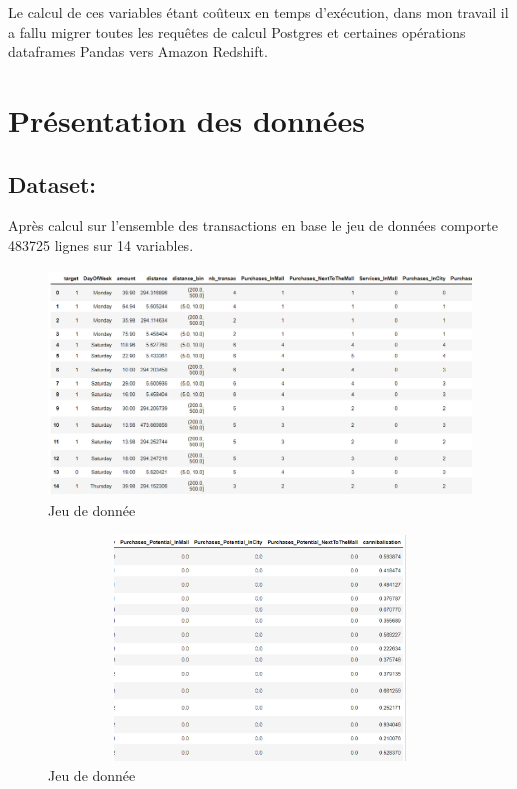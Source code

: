 Le calcul de ces variables étant coûteux en temps d'exécution, dans mon travail il a fallu migrer toutes les requêtes de calcul Postgres et certaines opérations dataframes Pandas vers Amazon Redshift.

\newpage
\section{Présentation des données}
\subsection{Dataset:}
Après calcul sur l'ensemble des transactions en base le jeu de données comporte 483725 lignes sur 14 variables.
\begin{figure}[h]
\begin{center}
\includegraphics[width=15cm,height=6cm]{images/dataset_1.png}
\caption[Jeu de donnée]{Jeu de donnée}
\label{monlabel}
\end{center}
\end{figure}

\begin{figure}[h]
\begin{center}
\includegraphics[width=15cm,height=6cm]{images/dataset_2.png}
\caption[Jeu de donnée]{Jeu de donnée}
\label{monlabel}
\end{center}
\end{figure}







